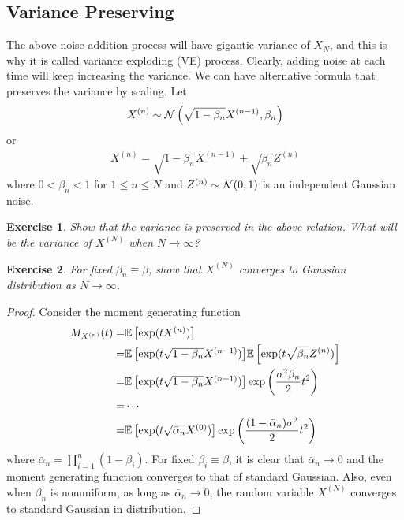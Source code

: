 \documentclass[11pt, a4paper]{article}
\newtheorem{exercise}{Exercise}
\begin{document}
\subsection{Variance Preserving}
The above noise addition process will have gigantic variance of $X_N$,
and this is why it is called variance exploding (VE) process.
Clearly, adding noise at each time will keep increasing the variance.
We can have alternative formula that preserves the variance by scaling.
Let
\begin{align}
    X^{(n)} \sim {\cal N}\left(\sqrt{1-\beta_n} X^{(n-1)},\beta_n \right)
\end{align}
or 
\begin{align}
    X^{(n)} = \sqrt{1-\beta_n} X^{(n-1)} + \sqrt{\beta_n }Z^{(n)}
\end{align}
where $0<\beta_n<1$ for $1\leq n\leq N$ and $Z^{(n)}\sim{\cal N}(0, 1)$ is an independent Gaussian noise.

\begin{exercise}
    Show that the variance is preserved in the above relation.
    What will be the variance of $X^{(N)}$ when $N\rightarrow \infty$?
\end{exercise}

\begin{exercise}
    For fixed $\beta_n\equiv \beta$, show that $X^{(N)}$ converges to Gaussian distribution as $N\rightarrow \infty$.
\end{exercise}
\begin{proof}
    Consider the moment generating function
    \begin{align}
        M_{X^{(n)}}(t) =& \Expec{\exp(t X^{(n)})}\\
        =& \Expec{\exp(t \sqrt{1-\beta_n} X^{(n-1)})} \Expec{\exp(t \sqrt{\beta_n}Z^{(n)})}\\
        =& \Expec{\exp(t \sqrt{1-\beta_n}X^{(n-1)})} \exp\left(\frac{\sigma^2\beta_n}{2}t^2\right)\\
        =& \cdots \\
        =& \Expec{\exp(t \sqrt{\bar{\alpha}_n} X^{(0)})} \exp\left(\frac{(1-\bar{\alpha}_n)\sigma^2}{2}t^2\right)
    \end{align}
    where $\bar{\alpha}_n = \prod_{i=1}^n (1-\beta_i)$.
    For fixed $\beta_i\equiv \beta$, it is clear that $\bar{\alpha}_n \rightarrow 0$ and the moment generating function
    converges to that of standard Gaussian.
    Also, even when $\beta_n$ is nonuniform, as long as $\bar{\alpha}_n\rightarrow 0$, the random variable $X^{(N)}$ converges to standard Gaussian in distribution.
\end{proof}
\end{document}
